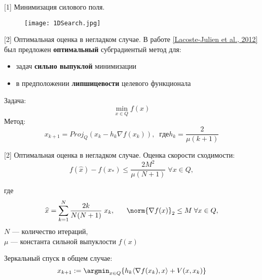 \begin{frame}{[1] Минимизация силового поля.}
    \begin{figure}
    \begin{center}
        \texttt{[image: 1DSearch.jpg]}
    \end{center}
    \end{figure}
    \begin{table}[h]
    \centering
    \end{table}
\end{frame}


\begin{frame}{[2] Оптимальная оценка в негладком случае.}
    В работе \href{https://arxiv.org/abs/1212.2002}{[Lacoste-Julien et al., 2012]} был предложен \textbf{оптимальный} субградиентый метод для:
    \begin{itemize}
        \item задач \textbf{сильно выпуклой} минимизации
        \item в предположении \textbf{липшицевости} целевого функционала
    \end{itemize}
    Задача: $$\min_{x \in Q} f(x)$$
    Метод: $$ x_{k+1} = {Proj}_{Q}(x_k - h_k \nabla f(x_k) ), \; \; где h_k = \frac{2}{\mu (k+1)} $$
\end{frame}


\begin{frame}{[2] Оптимальная оценка в негладком случае.}
    Оценка скорости сходимости: 
    $$
    \label{eq:1} f(\widehat{x}) - f(x_*) \leq \frac{2 M^{2}}{\mu (N+1)} \; \forall x \in Q,
    $$
    
    где $$\widehat{x} = \sum_{k=1}^{N} \frac{2 k}{N (N+1)} \; x_k,  \;\;\;\;\;\; \norm{\nabla f(x)}_{2} \leq M \; \forall x \in Q,$$
    $N$ --- количество итераций, \\
    $\mu$ --- константа сильной выпуклости $f(x)$ 
    
    \vspace{\baselineskip}
    Зеркальный спуск в общем случае:
    $$
    x_{k+1} := \argmin_{x \in Q} \{ h_k \langle \nabla f(x_k), x\rangle + V(x, x_k)\} 
    $$
\end{frame}

